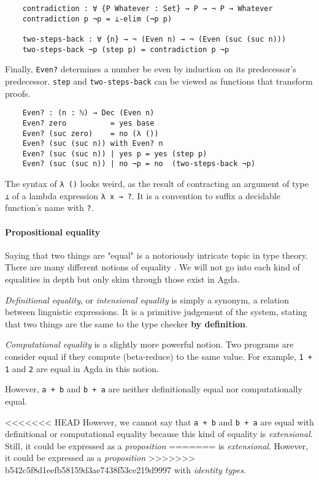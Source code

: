 \documentclass[../thesis.tex]{subfiles}
\begin{document}
\begin{lstlisting}
    contradiction : ∀ {P Whatever : Set} → P → ¬ P → Whatever
    contradiction p ¬p = ⊥-elim (¬p p)

    two-steps-back : ∀ {n} → ¬ (Even n) → ¬ (Even (suc (suc n)))
    two-steps-back ¬p (step p) = contradiction p ¬p
\end{lstlisting}

Finally, {\lstinline|Even?|} determines a number be even by induction on its
predecessor's predecessor. {\lstinline|step|} and {\lstinline|two-steps-back|}
can be viewed as functions that transform proofs.

\begin{lstlisting}
    Even? : (n : ℕ) → Dec (Even n)
    Even? zero          = yes base
    Even? (suc zero)    = no (λ ())
    Even? (suc (suc n)) with Even? n
    Even? (suc (suc n)) | yes p = yes (step p)
    Even? (suc (suc n)) | no ¬p = no  (two-steps-back ¬p)
\end{lstlisting}

The syntax of {\lstinline|λ ()|} looks weird, as the result of contracting
an argument of type {\lstinline|⊥|} of a lambda expression {\lstinline|λ x → ?|}.
It is a convention to suffix a decidable function's name with {\lstinline|?|}.

\paragraph{Propositional equality}

Saying that two things are "equal" is a notoriously intricate topic in type theory.
There are many different notions of equality \cite{equality}.
We will not go into each kind of equalities in depth but only skim through those exist in Agda.

\textit{Definitional equality}, or \textit{intensional equality} is simply a
synonym, a relation between linguistic expressions. It is a primitive judgement
of the system, stating that two things are the same to the type checker
\textbf{by definition}.

\textit{Computational equality} is a slightly more powerful notion.
Two programs are consider equal if they compute (beta-reduce) to the same value.
For example, {\lstinline|1 + 1|} and {\lstinline|2|} are equal in Agda in this notion.

However, {\lstinline|a + b|} and {\lstinline|b + a|} are neither definitionally
equal nor computationally equal.

<<<<<<< HEAD
However, we cannot say that {\lstinline|a + b|} and {\lstinline|b + a|}
are equal with definitional or computational equality because this kind of equality
is \textit{extensional}. Still, it could be expressed as a \textit{proposition}
=======
is \textit{extensional}.  However, it could be expressed as a \textit{proposition}
>>>>>>> b542c5f8d1eefb58159d3ae7438f53ce219d9997
with \textit{identity types}.
\end{document}
